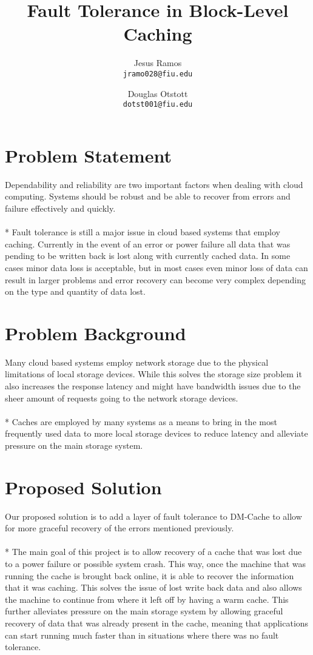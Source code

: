 \documentclass[letterpaper,12pt]{article}
\title{Fault Tolerance in Block-Level Caching}
\author{
  Jesus Ramos \\ \texttt{jramo028@fiu.edu} \and
  Douglas Otstott \\ \texttt{dotst001@fiu.edu}
}
\date{}
\begin{document}
\maketitle
\thispagestyle{empty}

\section*{Problem Statement}

Dependability and reliability are two important factors when dealing
with cloud computing. Systems should be robust and be able to recover
from errors and failure effectively and quickly. \\ \\*
%
Fault tolerance is still a major issue in cloud based systems that
employ caching. Currently in the event of an error or power failure
all data that was pending to be written back is lost along with
currently cached data. In some cases minor data loss is acceptable,
but in most cases even minor loss of data can result in larger
problems and error recovery can become very complex depending on the
type and quantity of data lost.


\section*{Problem Background}

Many cloud based systems employ network storage due to the physical
limitations of local storage devices. While this solves the storage
size problem it also increases the response latency and might have
bandwidth issues due to the sheer amount of requests going to the
network storage devices. \\ \\*
%
Caches are employed by many systems as a means to bring in the most
frequently used data to more local storage devices to reduce latency
and alleviate pressure on the main storage system.


\section*{Proposed Solution}

Our proposed solution is to add a layer of fault tolerance to DM-Cache
to allow for more graceful recovery of the errors mentioned
previously. \\ \\*
%
The main goal of this project is to allow recovery of a cache that was
lost due to a power failure or possible system crash. This way, once
the machine that was running the cache is brought back online, it is
able to recover the information that it was caching. This solves the
issue of lost write back data and also allows the machine to continue
from where it left off by having a warm cache. This further alleviates
pressure on the main storage system by allowing graceful recovery of
data that was already present in the cache, meaning that applications
can start running much faster than in situations where there was no
fault tolerance.
\end{document}
